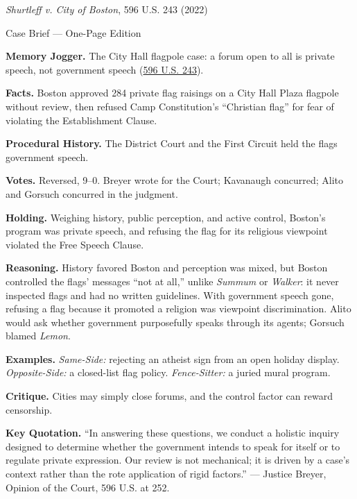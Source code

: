 \documentclass[12pt]{article}
\begin{document}
\begin{center}
{\Large \textit{Shurtleff v. City of Boston}, 596 U.S. 243 (2022)\par}
\vspace{0.3em}
{\normalsize Case Brief --- One-Page Edition\par}
\end{center}

\textbf{Memory Jogger.} The City Hall flagpole case: a forum open to all is private speech, not government speech (\href{https://supreme.justia.com/cases/federal/us/596/20-1800/}{596 U.S. 243}).

\textbf{Facts.} Boston approved 284 private flag raisings on a City Hall Plaza flagpole without review, then refused Camp Constitution's ``Christian flag'' for fear of violating the Establishment Clause.

\textbf{Procedural History.} The District Court and the First Circuit held the flags government speech.

\textbf{Votes.} Reversed, 9--0. Breyer wrote for the Court; Kavanaugh concurred; Alito and Gorsuch concurred in the judgment.

\textbf{Holding.} Weighing history, public perception, and active control, Boston's program was private speech, and refusing the flag for its religious viewpoint violated the Free Speech Clause.

\textbf{Reasoning.} History favored Boston and perception was mixed, but Boston controlled the flags' messages ``not at all,'' unlike \textit{Summum} or \textit{Walker}: it never inspected flags and had no written guidelines. With government speech gone, refusing a flag because it promoted a religion was viewpoint discrimination. Alito would ask whether government purposefully speaks through its agents; Gorsuch blamed \textit{Lemon}.

\textbf{Examples.} \emph{Same-Side:} rejecting an atheist sign from an open holiday display. \emph{Opposite-Side:} a closed-list flag policy. \emph{Fence-Sitter:} a juried mural program.

\textbf{Critique.} Cities may simply close forums, and the control factor can reward censorship.

\textbf{Key Quotation.} ``In answering these questions, we conduct a holistic inquiry designed to determine whether the government intends to speak for itself or to regulate private expression. Our review is not mechanical; it is driven by a case's context rather than the rote application of rigid factors.'' --- Justice Breyer, Opinion of the Court, 596 U.S. at 252.
\end{document}
